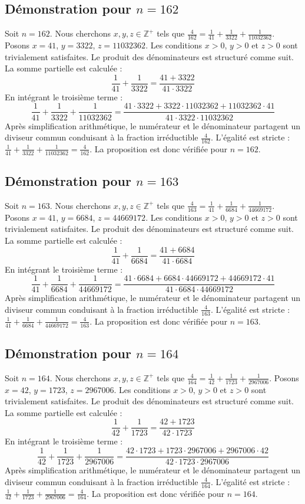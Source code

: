 \documentclass[11pt,a4paper]{article}
\begin{document}
\subsection{Démonstration pour $n = 162$}
Soit $n = 162$. Nous cherchons $x, y, z \in \mathbb{Z}^{+}$ tels que $\frac{4}{162} = \frac{1}{41} + \frac{1}{3322} + \frac{1}{11032362}$.
Posons $x = 41$, $y = 3322$, $z = 11032362$.
Les conditions $x > 0$, $y > 0$ et $z > 0$ sont trivialement satisfaites.
Le produit des dénominateurs est structuré comme suit. La somme partielle est calculée :
$$ \frac{1}{41} + \frac{1}{3322} = \frac{41+3322}{41 \cdot 3322} $$
En intégrant le troisième terme :
$$ \frac{1}{41} + \frac{1}{3322} + \frac{1}{11032362} = \frac{41 \cdot 3322 + 3322 \cdot 11032362 + 11032362 \cdot 41}{41 \cdot 3322 \cdot 11032362} $$
Après simplification arithmétique, le numérateur et le dénominateur partagent un diviseur commun conduisant à la fraction irréductible $\frac{4}{162}$.
L'égalité est stricte : $\frac{1}{41} + \frac{1}{3322} + \frac{1}{11032362} = \frac{4}{162}$.
La proposition est donc vérifiée pour $n = 162$.
\subsection{Démonstration pour $n = 163$}
Soit $n = 163$. Nous cherchons $x, y, z \in \mathbb{Z}^{+}$ tels que $\frac{4}{163} = \frac{1}{41} + \frac{1}{6684} + \frac{1}{44669172}$.
Posons $x = 41$, $y = 6684$, $z = 44669172$.
Les conditions $x > 0$, $y > 0$ et $z > 0$ sont trivialement satisfaites.
Le produit des dénominateurs est structuré comme suit. La somme partielle est calculée :
$$ \frac{1}{41} + \frac{1}{6684} = \frac{41+6684}{41 \cdot 6684} $$
En intégrant le troisième terme :
$$ \frac{1}{41} + \frac{1}{6684} + \frac{1}{44669172} = \frac{41 \cdot 6684 + 6684 \cdot 44669172 + 44669172 \cdot 41}{41 \cdot 6684 \cdot 44669172} $$
Après simplification arithmétique, le numérateur et le dénominateur partagent un diviseur commun conduisant à la fraction irréductible $\frac{4}{163}$.
L'égalité est stricte : $\frac{1}{41} + \frac{1}{6684} + \frac{1}{44669172} = \frac{4}{163}$.
La proposition est donc vérifiée pour $n = 163$.
\subsection{Démonstration pour $n = 164$}
Soit $n = 164$. Nous cherchons $x, y, z \in \mathbb{Z}^{+}$ tels que $\frac{4}{164} = \frac{1}{42} + \frac{1}{1723} + \frac{1}{2967006}$.
Posons $x = 42$, $y = 1723$, $z = 2967006$.
Les conditions $x > 0$, $y > 0$ et $z > 0$ sont trivialement satisfaites.
Le produit des dénominateurs est structuré comme suit. La somme partielle est calculée :
$$ \frac{1}{42} + \frac{1}{1723} = \frac{42+1723}{42 \cdot 1723} $$
En intégrant le troisième terme :
$$ \frac{1}{42} + \frac{1}{1723} + \frac{1}{2967006} = \frac{42 \cdot 1723 + 1723 \cdot 2967006 + 2967006 \cdot 42}{42 \cdot 1723 \cdot 2967006} $$
Après simplification arithmétique, le numérateur et le dénominateur partagent un diviseur commun conduisant à la fraction irréductible $\frac{4}{164}$.
L'égalité est stricte : $\frac{1}{42} + \frac{1}{1723} + \frac{1}{2967006} = \frac{4}{164}$.
La proposition est donc vérifiée pour $n = 164$.
\end{document}
